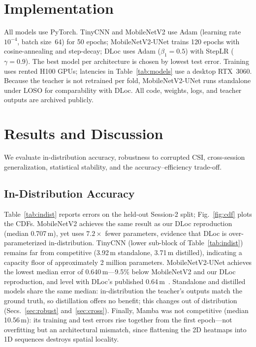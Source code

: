 \documentclass[conference,a4paper]{IEEEtran}
\begin{document}
\section{Implementation}
All models use PyTorch. TinyCNN and MobileNetV2 use Adam (learning rate $10^{-4}$, batch size~64) for 50 epochs; MobileNetV2-UNet trains 120 epochs with cosine-annealing and step-decay; DLoc uses Adam ($\beta_1{=}0.5$) with StepLR ($\gamma{=}0.9$). The best model per architecture is chosen by lowest test error. Training uses rented H100 GPUs; latencies in Table~\ref{tab:models} use a desktop RTX~3060. Because the teacher is not retrained per fold, MobileNetV2-UNet runs standalone under LOSO for comparability with DLoc. All code, weights, logs, and teacher outputs are archived publicly.

\section{Results and Discussion}
We evaluate in-distribution accuracy, robustness to corrupted CSI, cross-session generalization, statistical stability, and the accuracy--efficiency trade-off.

\subsection{In-Distribution Accuracy}
\label{sec:indist}
Table~\ref{tab:indist} reports errors on the held-out Session-2 split; Fig.~\ref{fig:cdf} plots the CDFs. MobileNetV2 achieves the same result as our DLoc reproduction (median 0.707\,m), yet uses $7.2\times$ fewer parameters, evidence that DLoc is over-parameterized in-distribution. TinyCNN (lower sub-block of Table~\ref{tab:indist}) remains far from competitive (3.92\,m standalone, 3.71\,m distilled), indicating a capacity floor of approximately 2 million parameters. MobileNetV2-UNet achieves the lowest median error of 0.640\,m---9.5\% below MobileNetV2 and our DLoc reproduction, and level with DLoc's published 0.64\,m~\cite{ayyalasomayajula2020deep}. Standalone and distilled models share the same median: in-distribution the teacher's outputs match the ground truth, so distillation offers no benefit; this changes out of distribution (Secs.~\ref{sec:robust} and~\ref{sec:cross}). Finally, Mamba was not competitive (median 10.56\,m): its training and test errors rise together from the first epoch---not overfitting but an architectural mismatch, since flattening the 2D heatmaps into 1D sequences destroys spatial locality.
\end{document}

